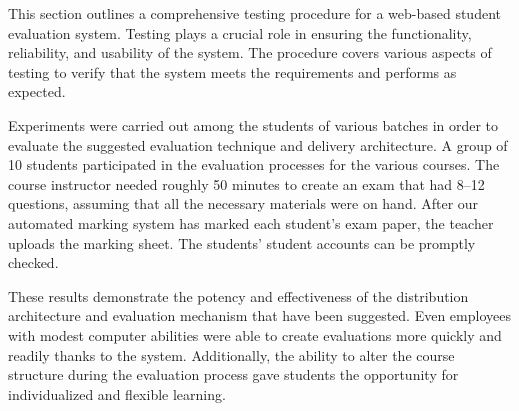 This section outlines a comprehensive testing procedure for a web-based student evaluation system. Testing plays a crucial role in ensuring the functionality, reliability, and usability of the system. The procedure covers various aspects of testing to verify that the system meets the requirements and performs as expected.

Experiments were carried out among the students of various batches in order to evaluate the suggested evaluation technique and delivery architecture. A group of 10 students participated in the evaluation processes for the various courses.  The course instructor needed roughly 50 minutes to create an exam that had 8–12 questions, assuming that all the necessary materials were on hand.  After our automated marking system has marked each student's exam paper, the teacher uploads the marking sheet. The students' student accounts can be promptly checked.

These results demonstrate the potency and effectiveness of the distribution architecture and evaluation mechanism that have been suggested. Even employees with modest computer abilities were able to create evaluations more quickly and readily thanks to the system. Additionally, the ability to alter the course structure during the evaluation process gave students the opportunity for individualized and flexible learning.
